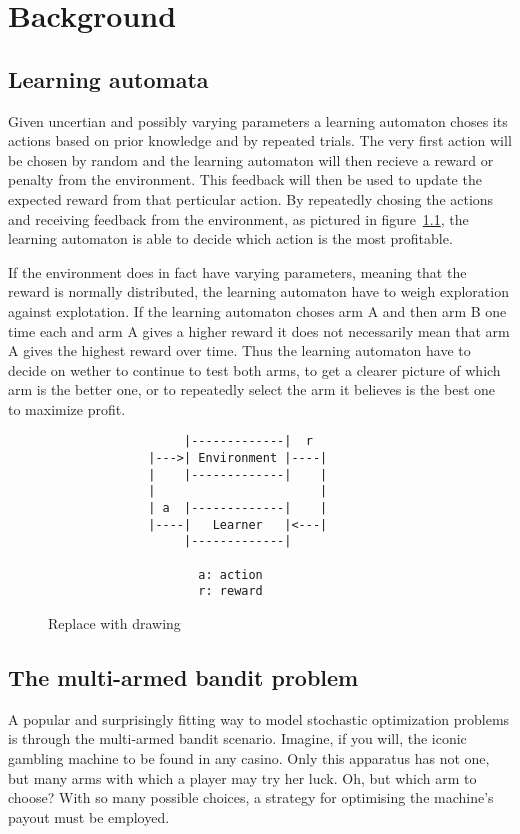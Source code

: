 \chapter{Background}
\label{ch:background}

\section{Learning automata}
Given uncertian and possibly varying parameters a learning automaton choses
its actions based on prior knowledge and by repeated trials. The very first action
will be chosen by random and the learning automaton will then recieve a reward or
penalty from the environment. This feedback will then be used to update the expected reward
from that perticular action. By repeatedly chosing the actions and receiving feedback
from the environment, as pictured in figure~\ref{fig:la}, the learning automaton is able to
decide which action is the most profitable. 

If the environment does in fact have varying parameters, meaning that the reward
is normally distributed, the learning automaton have to weigh exploration against
explotation. If the learning automaton choses arm A and then arm B one time each and
arm A gives a higher reward it does not necessarily mean that arm A gives the highest
reward over time. Thus the learning automaton have to decide on wether to continue
to test both arms, to get a clearer picture of which arm is the better one, or to repeatedly
select the arm it believes is the best one to maximize profit. 

\begin{figure}[ht]
        \begin{verbatim}
                   |-------------|  r
              |--->| Environment |----|
              |    |-------------|    |
              |                       | 
              | a  |-------------|    |
              |----|   Learner   |<---|
                   |-------------|
         
                     a: action
                     r: reward
        \end{verbatim}
        \label{fig:la}
    \caption{Replace with drawing}
\end{figure}

\section{The multi-armed bandit problem}
A popular and surprisingly fitting way to model stochastic optimization problems 
is through the multi-armed bandit scenario. Imagine, if you will, the iconic 
gambling machine to be found in any casino. Only this apparatus has not one, but 
many arms with which a player may try her luck. Oh, but which arm to choose? 
With so many possible choices, a strategy for optimising the machine’s payout 
must be employed. 

